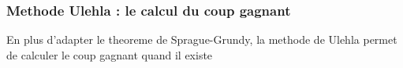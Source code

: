 \documentclass{beamer}
\begin{document}
  \begin{frame}
    \frametitle{Methode Ulehla : le calcul du coup gagnant}
     {
      \begin{block}{}  
        En plus d'adapter le theoreme de Sprague-Grundy, la methode de Ulehla permet de calculer le coup gagnant quand il existe
      \end{block}
    }
  \end{frame}
\end{document}
